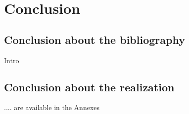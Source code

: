 \chapter*{Conclusion}

\section{Conclusion about the bibliography}

Intro

\section{Conclusion about the realization}

.... are available in the Annexes
